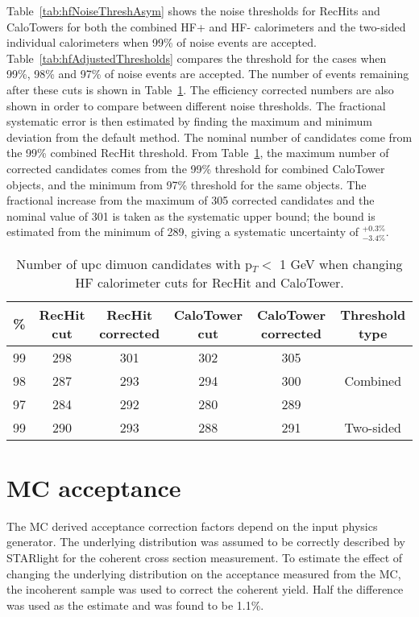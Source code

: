     Table~\ref{tab:hfNoiseThreshAsym} shows the noise thresholds for RecHits 
      and CaloTowers for both the combined HF+ and HF- calorimeters and the 
      two-sided individual calorimeters when 99\% of noise events are accepted.
    Table~\ref{tab:hfAdjustedThresholds} compares the threshold for the cases 
      when 99\%, 98\% and 97\% of noise events are accepted.
    The number of \JPsi{} events remaining after these cuts is shown in 
      Table~\ref{tab:hfAdjThreshYields}. 
    The efficiency corrected numbers are also shown in order to compare between
      different noise thresholds. 
    The fractional systematic error is then estimated by finding the maximum 
      and minimum deviation from the default method. 
    The nominal number of candidates come from the 99\% combined RecHit 
      threshold.
    From Table~\ref{tab:hfAdjThreshYields}, the maximum number of corrected 
      candidates comes from the 99\% threshold for combined CaloTower objects,
      and the minimum from 97\% threshold for the same objects. 
    The fractional increase from the maximum of 305 corrected candidates and 
      the nominal value of 301 is taken as the systematic upper bound; the 
      bound is estimated from the minimum of 289, giving a systematic 
      uncertainty of $^{+0.3\%}_{-3.4\%}$.
    \begin{table}[!Hhbt]
      \centering
        \begin{tabular}{|c|c|c|c|c|c|} \hline
          \% &  RecHit cut & RecHit corrected & CaloTower cut & CaloTower corrected & Threshold type \\ \hline
          99 & 298 & 301 & 302 & 305 & \multirow{3}{*}{Combined} \\ \hhline{-----~}
          98 & 287 & 293 & 294 & 300 & \\ \hhline{-----~}
          97 & 284 & 292 & 280 & 289 & \\ \hline \hline
          99 & 290 & 293 & 288 & 291 & Two-sided \\ \hline
        \end{tabular}
      \caption{Number of upc dimuon candidates with  p$_{T} <$ 1 GeV when changing HF calorimeter cuts for RecHit and CaloTower.}
      \label{tab:hfAdjThreshYields}
    \end{table}

  \section{MC acceptance}
    The MC derived acceptance correction factors depend on the input physics
      generator. 
    The underlying \pt{} distribution was assumed to be correctly 
      described by STARlight for the coherent cross section measurement.
    To estimate the effect of changing the underlying \pt{} distribution 
      on the acceptance measured from the MC, the incoherent sample was used 
      to correct the coherent yield.
    Half the difference was used as the estimate and was found to be 1.1\%.

